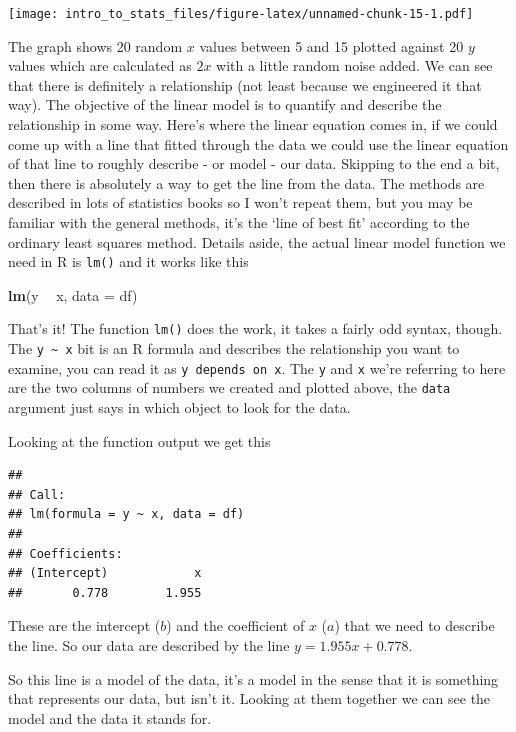 \documentclass[
]{book}
\newenvironment{Shaded}{\begin{snugshade}}{\end{snugshade}}
\newcommand{\DataTypeTok}[1]{\textcolor[rgb]{0.13,0.29,0.53}{#1}}
\newcommand{\KeywordTok}[1]{\textcolor[rgb]{0.13,0.29,0.53}{\textbf{#1}}}
\newcommand{\NormalTok}[1]{#1}
\newcommand{\OperatorTok}[1]{\textcolor[rgb]{0.81,0.36,0.00}{\textbf{#1}}}
\newcommand{\StringTok}[1]{\textcolor[rgb]{0.31,0.60,0.02}{#1}}
\begin{document}
\texttt{[image: intro\_to\_stats\_files/figure-latex/unnamed-chunk-15-1.pdf]}

The graph shows 20 random \(x\) values between 5 and 15 plotted against 20 \(y\) values which are calculated as \(2x\) with a little random noise added. We can see that there is definitely a relationship (not least because we engineered it that way). The objective of the linear model is to quantify and describe the relationship in some way. Here's where the linear equation comes in, if we could come up with a line that fitted through the data we could use the linear equation of that line to roughly describe - or model - our data. Skipping to the end a bit, then there is absolutely a way to get the line from the data. The methods are described in lots of statistics books so I won't repeat them, but you may be familiar with the general methods, it's the `line of best fit' according to the ordinary least squares method. Details aside, the actual linear model function we need in R is \texttt{lm()} and it works like this

\begin{Shaded}
\begin{Highlighting}[]
\KeywordTok{lm}\NormalTok{(y }\OperatorTok{~}\StringTok{ }\NormalTok{x, }\DataTypeTok{data =}\NormalTok{ df)}
\end{Highlighting}
\end{Shaded}

That's it! The function \texttt{lm()} does the work, it takes a fairly odd syntax, though. The \texttt{y\ \textasciitilde{}\ x} bit is an R formula and describes the relationship you want to examine, you can read it as \texttt{y\ depends\ on\ x}. The \texttt{y} and \texttt{x} we're referring to here are the two columns of numbers we created and plotted above, the \texttt{data} argument just says in which object to look for the data.

Looking at the function output we get this

\begin{verbatim}
## 
## Call:
## lm(formula = y ~ x, data = df)
## 
## Coefficients:
## (Intercept)            x  
##       0.778        1.955
\end{verbatim}

These are the intercept (\(b\)) and the coefficient of \(x\) (\(a\)) that we need to describe the line. So our data are described by the line \(y = 1.955x + 0.778\).

So this line is a model of the data, it's a model in the sense that it is something that represents our data, but isn't it. Looking at them together we can see the model and the data it stands for.
\end{document}
